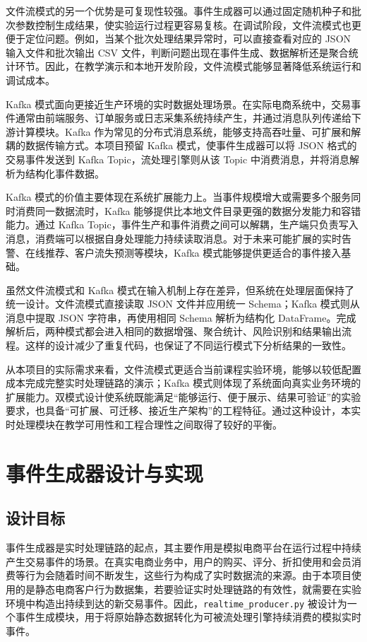 \documentclass[12pt,hyperref,a4paper,UTF8]{ctexart}
\begin{document}
文件流模式的另一个优势是可复现性较强。事件生成器可以通过固定随机种子和批次参数控制生成结果，使实验运行过程更容易复核。在调试阶段，文件流模式也更便于定位问题。例如，当某个批次处理结果异常时，可以直接查看对应的 JSON 输入文件和批次输出 CSV 文件，判断问题出现在事件生成、数据解析还是聚合统计环节。因此，在教学演示和本地开发阶段，文件流模式能够显著降低系统运行和调试成本。

Kafka 模式面向更接近生产环境的实时数据处理场景。在实际电商系统中，交易事件通常由前端服务、订单服务或日志采集系统持续产生，并通过消息队列传递给下游计算模块。Kafka 作为常见的分布式消息系统，能够支持高吞吐量、可扩展和解耦的数据传输方式。本项目预留 Kafka 模式，使事件生成器可以将 JSON 格式的交易事件发送到 Kafka Topic，流处理引擎则从该 Topic 中消费消息，并将消息解析为结构化事件数据。

Kafka 模式的价值主要体现在系统扩展能力上。当事件规模增大或需要多个服务同时消费同一数据流时，Kafka 能够提供比本地文件目录更强的数据分发能力和容错能力。通过 Kafka Topic，事件生产和事件消费之间可以解耦，生产端只负责写入消息，消费端可以根据自身处理能力持续读取消息。对于未来可能扩展的实时告警、在线推荐、客户流失预测等模块，Kafka 模式能够提供更适合的事件接入基础。

虽然文件流模式和 Kafka 模式在输入机制上存在差异，但系统在处理层面保持了统一设计。文件流模式直接读取 JSON 文件并应用统一 Schema；Kafka 模式则从消息中提取 JSON 字符串，再使用相同 Schema 解析为结构化 DataFrame。完成解析后，两种模式都会进入相同的数据增强、聚合统计、风险识别和结果输出流程。这样的设计减少了重复代码，也保证了不同运行模式下分析结果的一致性。

从本项目的实际需求来看，文件流模式更适合当前课程实验环境，能够以较低配置成本完成完整实时处理链路的演示；Kafka 模式则体现了系统面向真实业务环境的扩展能力。双模式设计使系统既能满足“能够运行、便于展示、结果可验证”的实验要求，也具备“可扩展、可迁移、接近生产架构”的工程特征。通过这种设计，本实时处理模块在教学可用性和工程合理性之间取得了较好的平衡。

\section{事件生成器设计与实现}

\subsection{设计目标}

事件生成器是实时处理链路的起点，其主要作用是模拟电商平台在运行过程中持续产生交易事件的场景。在真实电商业务中，用户的购买、评分、折扣使用和会员消费等行为会随着时间不断发生，这些行为构成了实时数据流的来源。由于本项目使用的是静态电商客户行为数据集，若要验证实时处理链路的有效性，就需要在实验环境中构造出持续到达的新交易事件。因此，\texttt{realtime\_producer.py} 被设计为一个事件生成模块，用于将原始静态数据转化为可被流处理引擎持续消费的模拟实时事件。
\end{document}
